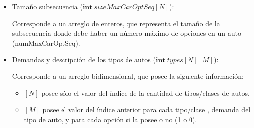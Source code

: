 \begin{itemize}
	\item Tamaño subsecuencia ($\textbf{int}\ sizeMaxCarOptSeq[N]$):

		Corresponde a un arreglo de enteros, que representa el tamaño de la subsecuencia donde debe haber un número máximo de opciones en un auto (numMaxCarOptSeq).

	\item Demandas y descripción de los tipos de autos ($\textbf{int}\ types[N][M]$):
	
	Corresponde a un arreglo bidimensional, que posee la siguiente información:
	\begin{itemize}
		\item $[N]$ posee sólo el valor del índice de la cantidad de tipos/clases de autos.
		\item $[M]$ posee el valor del índice anterior para cada tipo/clase , demanda del tipo de auto, y para cada opción si la posee o no (1 o 0).
	\end{itemize}
	

\end{itemize}
